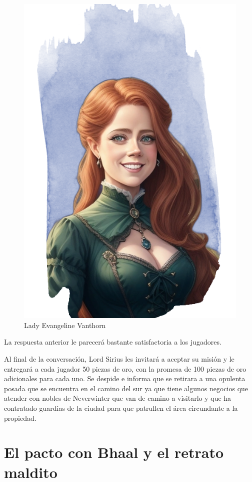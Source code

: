 \documentclass[10pt,twoside,twocolumn,openany]{dndbook}
\begin{document}
\begin{figure}
  \centering
  \includegraphics[width=0.9\columnwidth]{media/evangeline-vanthorn.png}
  \caption{Lady Evangeline Vanthorn}
\end{figure}

La respuesta anterior le parecerá bastante satisfactoria a los jugadores.

Al final de la conversación, Lord Sirius les invitará a aceptar su misión y le entregará a cada 
jugador 50 piezas de oro, con la promesa de 100 piezas de oro adicionales para cada uno. 
Se despide e informa que se retirara a una opulenta posada que se encuentra en el camino del sur 
ya que tiene algunos negocios que atender con nobles de Neverwinter que van de camino a visitarlo 
y que ha contratado guardias de la ciudad para que patrullen el área circundante a la propiedad.

\section{El pacto con Bhaal y el retrato maldito}
\end{document}
